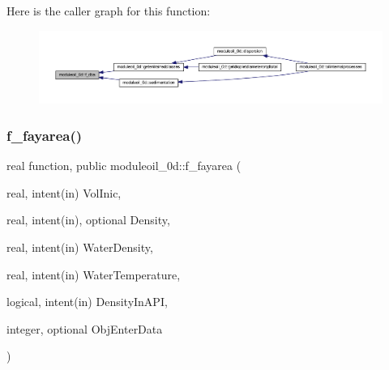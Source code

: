 Here is the caller graph for this function\+:\nopagebreak
\begin{figure}[H]
\begin{center}
\leavevmode
\includegraphics[width=350pt]{namespacemoduleoil__0d_a4505ef2294ae0f155df322a4eac4bf20_icgraph}
\end{center}
\end{figure}
\mbox{\label{namespacemoduleoil__0d_a4e51cfec6aa7ab1925d6fe26889918be}} 
\subsubsection{\texorpdfstring{f\+\_\+fayarea()}{f\_fayarea()}}
{\footnotesize\ttfamily real function, public moduleoil\+\_\+0d\+::f\+\_\+fayarea (\begin{DoxyParamCaption}\item[{real, intent(in)}]{Vol\+Inic,  }\item[{real, intent(in), optional}]{Density,  }\item[{real, intent(in)}]{Water\+Density,  }\item[{real, intent(in)}]{Water\+Temperature,  }\item[{logical, intent(in)}]{Density\+In\+A\+PI,  }\item[{integer, optional}]{Obj\+Enter\+Data }\end{DoxyParamCaption})}

